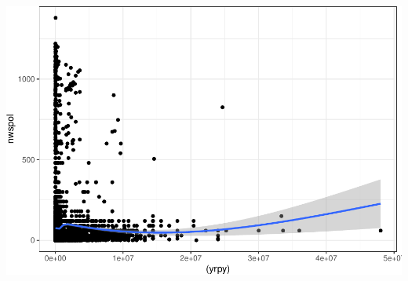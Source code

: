 \documentclass[
]{article}
\begin{document}
\includegraphics{ESS_DE_files/figure-latex/GAM peperation-5.pdf}
\end{document}
